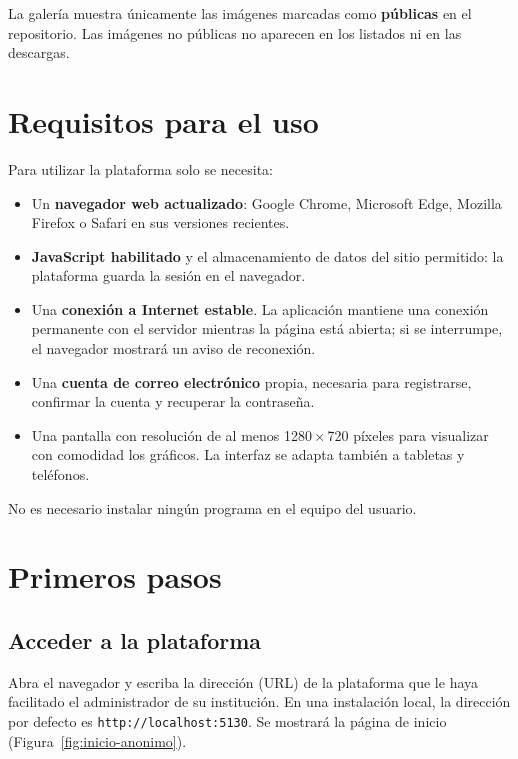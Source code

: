 \documentclass[11pt,a4paper]{article}
\newcommand{\seccion}[1]{\clearpage\section{#1}}
\begin{document}
\begin{notabox}
La galería muestra únicamente las imágenes marcadas como \textbf{públicas} en el
repositorio. Las imágenes no públicas no aparecen en los listados ni en las
descargas.
\end{notabox}

\seccion{Requisitos para el uso}

Para utilizar la plataforma solo se necesita:

\begin{itemize}
  \item Un \textbf{navegador web actualizado}: Google Chrome, Microsoft Edge,
  Mozilla Firefox o Safari en sus versiones recientes.
  \item \textbf{JavaScript habilitado} y el almacenamiento de datos del sitio
  permitido: la plataforma guarda la sesión en el navegador.
  \item Una \textbf{conexión a Internet estable}. La aplicación mantiene una
  conexión permanente con el servidor mientras la página está abierta; si se
  interrumpe, el navegador mostrará un aviso de reconexión.
  \item Una \textbf{cuenta de correo electrónico} propia, necesaria para
  registrarse, confirmar la cuenta y recuperar la contraseña.
  \item Una pantalla con resolución de al menos 1280\,×\,720 píxeles para
  visualizar con comodidad los gráficos. La interfaz se adapta también a tabletas
  y teléfonos.
\end{itemize}

No es necesario instalar ningún programa en el equipo del usuario.

\seccion{Primeros pasos}
\label{sec:primeros-pasos}

\subsection{Acceder a la plataforma}

Abra el navegador y escriba la dirección (URL) de la plataforma que le haya
facilitado el administrador de su institución. En una instalación local, la
dirección por defecto es \texttt{http://localhost:5130}. Se mostrará la página de
inicio (Figura~\ref{fig:inicio-anonimo}).
\end{document}
